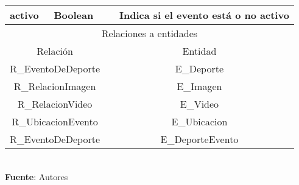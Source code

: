 \begin{landscape}
\begin{table}[!htb]
\begin{center}
{\begin{tabular}{|p{4cm}|p{2cm}|p{2cm}|p{12cm}|}
			\hline
			activo &
			Boolean &
			&
			Indica si el evento está o no activo \\
			\hline
			\multicolumn{4}{|c|}{Relaciones a entidades} \\
			\hline
			\multicolumn{2}{|c|}{Relación} & \multicolumn{2}{c|}{Entidad} \\
			\hline
			\multicolumn{2}{|c|}{R\_EventoDeDeporte} & 
			\multicolumn{2}{c|}{E\_Deporte} \\
			\hline
			\multicolumn{2}{|c|}{R\_RelacionImagen} & 
			\multicolumn{2}{c|}{E\_Imagen} \\
			\hline
			\multicolumn{2}{|c|}{R\_RelacionVideo} & 
			\multicolumn{2}{c|}{E\_Video} \\
			\hline
			\multicolumn{2}{|c|}{R\_UbicacionEvento} & 
			\multicolumn{2}{c|}{E\_Ubicacion} \\
			\hline
			\multicolumn{2}{|c|}{R\_EventoDeDeporte} & 
			\multicolumn{2}{c|}{E\_DeporteEvento} \\
			\hline
		\end{tabular}
		} \\
		\textbf{Fuente}: Autores
	\end{center}
\end{table}
\end{landscape}